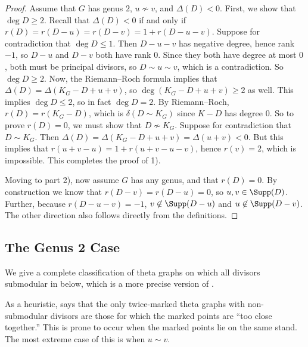 \begin{proof}
Assume that $G$ has genus $2$, $u \not\sim v$, and $\Delta(D) < 0$.
First, we show that $\deg D \geq 2$.
Recall that $\Delta(D) <0$ if and only if $r(D) = r(D-u) = r(D-v) = 1+r(D-u-v)$. Suppose for contradiction that $\deg D \leq 1$. Then $D-u-v$ has negative degree, hence rank $-1$, so $D-u$ and $D-v$ both have rank $0$. Since they both have degree at most $0$, both must be principal divisors, so $D \sim u \sim v$, which is a contradiction. So $\deg D \geq 2$. Now, the Riemann--Roch formula implies that $\Delta(D) = \Delta(K_G-D+u+v)$, so $\deg (K_G-D+u+v) \geq 2$ as well. This implies $\deg D \leq 2$, so in fact $\deg D = 2$. By Riemann--Roch, $r(D) = r(K_G-D)$, which is $\delta(D \sim K_G)$ since $K-D$ has degree $0$. So to prove $r(D) = 0$, we must show that $D \not\sim K_G$. Suppose for contradiction that $D \sim K_G$. Then $\Delta(D) = \Delta(K_G-D+u+v) = \Delta(u+v) < 0$. But this implies that $r(u+v-u) = 1 + r(u+v-u-v)$, hence $r(v) = 2$, which is impossible. This completes the proof of 1).  

Moving to part 2), now assume $G$ has any genus, and that $r(D) = 0$. By construction we know that $r(D-v) = r(D-u) = 0$, so $u,v \in \Supp(D)$. Further, because $r(D-u-v) = -1$, $v \not \in \Supp(D-u)$ and $u \not \in \Supp(D-v)$. The other direction also follows directly from the definitions.
\end{proof}


\subsection{The Genus 2 Case}

We give a complete classification of theta graphs on which all divisors submodular in  below, which is a more precise version of .

\begin{rema}\label{rem-closePoints}
    As a heuristic,  says that the only twice-marked theta graphs with non-submodular divisors are those for which the marked points are ``too close together.'' This is prone to occur when the marked points lie on the same stand. The most extreme case of this is when  $u\sim v$.
\end{rema}


